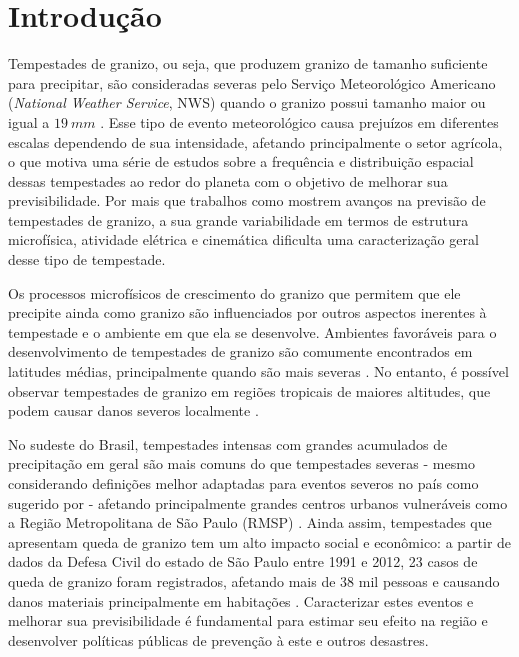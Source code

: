 \chapter{Introdução}

Tempestades de granizo, ou seja, que produzem granizo de tamanho suficiente para precipitar, são consideradas severas pelo Serviço Meteorológico Americano (\textit{National Weather Service}, NWS) quando o granizo possui tamanho maior ou igual a $19\:mm$ \cite{Moller2001c}. Esse tipo de evento meteorológico causa prejuízos em diferentes escalas dependendo de sua intensidade, afetando principalmente o setor agrícola, o que motiva uma série de estudos sobre a frequência e distribuição espacial dessas tempestades ao redor do planeta \cite{Dessens1994, Knight2001, Eccel2012, Berthet2013, Baldi2014, Jin2017, Martins2017} com o objetivo de melhorar sua previsibilidade. Por mais que trabalhos como  mostrem avanços na previsão de tempestades de granizo, a sua grande variabilidade em termos de estrutura microfísica, atividade elétrica e cinemática dificulta uma caracterização geral desse tipo de tempestade.

Os processos microfísicos de crescimento do granizo que permitem que ele precipite ainda como granizo são influenciados por outros aspectos inerentes à tempestade e o ambiente em que ela se desenvolve. Ambientes favoráveis para o desenvolvimento de tempestades de granizo são comumente encontrados em latitudes médias, principalmente quando são mais severas \cite{Court1982}. No entanto, é possível observar tempestades de granizo em regiões tropicais de maiores altitudes, que podem causar danos severos localmente \cite{Morgan1976}.

No sudeste do Brasil, tempestades intensas com grandes acumulados de precipitação em geral são mais comuns do que tempestades severas - mesmo considerando definições melhor adaptadas para eventos severos no país como sugerido por  - afetando principalmente grandes centros urbanos vulneráveis como a Região Metropolitana de São Paulo (RMSP) \cite{Vemado2016}. Ainda assim, tempestades que apresentam queda de granizo tem um alto impacto social e econômico: a partir de dados da Defesa Civil do estado de São Paulo entre 1991 e 2012, 23 casos de queda de granizo foram registrados, afetando mais de 38 mil pessoas e causando danos materiais principalmente em habitações \cite{Ceped2012}. Caracterizar estes eventos e melhorar sua previsibilidade é fundamental para estimar seu efeito na região e desenvolver políticas públicas de prevenção à este e outros desastres.

